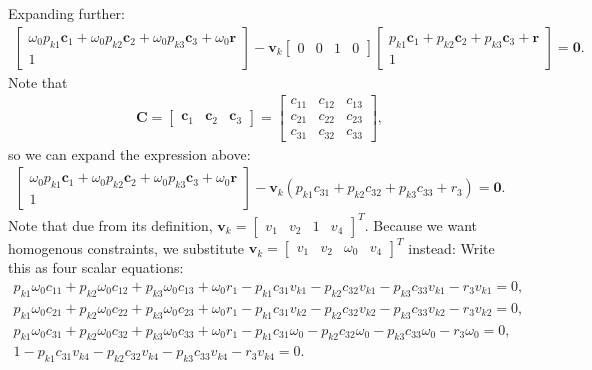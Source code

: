\documentclass{article}
\newcommand{\mbf}[1]{\mathbf{#1}}
\begin{document}
Expanding further:
\begin{align}
    \begin{bmatrix}\omega_0 p_{k1} \mbf{c}_1 + \omega_0 p_{k2} \mbf{c}_2 + \omega_0 p_{k3} \mbf{c}_3 + \omega_0 \mbf{r} \\ 1\end{bmatrix} - \mbf{v}_k \begin{bmatrix} 0 & 0 & 1 & 0 \end{bmatrix} \begin{bmatrix} p_{k1} \mbf{c}_1 + p_{k2} \mbf{c}_2 + p_{k3} \mbf{c}_3 + \mbf{r} \\ 1\end{bmatrix} = \mbf{0}.
\end{align}
Note that
\begin{align}
    \mbf{C} = \begin{bmatrix} \mbf{c}_1 & \mbf{c}_2 & \mbf{c}_3\end{bmatrix} = \begin{bmatrix} c_{11} & c_{12} & c_{13} \\ c_{21} & c_{22} & c_{23} \\ c_{31} & c_{32} & c_{33} \end{bmatrix},
\end{align}
so we can expand the expression above:
\begin{align}
    \begin{bmatrix}\omega_0 p_{k1} \mbf{c}_1 + \omega_0 p_{k2} \mbf{c}_2 + \omega_0 p_{k3} \mbf{c}_3 + \omega_0 \mbf{r} \\ 1\end{bmatrix} - \mbf{v}_k (p_{k1}c_{31} + p_{k2} c_{32} + p_{k3} c_{33} + r_3) = \mbf{0}.
\end{align}
Note that due from its definition, $\mbf{v}_k = \begin{bmatrix} v_1 & v_2 & 1 & v_4 \end{bmatrix}^T$. Because we want homogenous
constraints, we substitute $\mbf{v}_k = \begin{bmatrix} v_1 & v_2 & \omega_0 & v_4 \end{bmatrix}^T$ instead:
Write this as four scalar equations:
\begin{align}
    p_{k1} \omega_0 c_{11} + p_{k2} \omega_0 c_{12} + p_{k3} \omega_0 c_{13} + \omega_0 r_1 - p_{k1} c_{31} v_{k1}- p_{k2} c_{32} v_{k1} - p_{k3} c_{33} v_{k1} - r_3 v_{k1}= 0,\\
    p_{k1} \omega_0 c_{21} + p_{k2} \omega_0 c_{22} + p_{k3} \omega_0 c_{23} + \omega_0 r_1 - p_{k1} c_{31} v_{k2}- p_{k2} c_{32} v_{k2} - p_{k3} c_{33} v_{k2} - r_3 v_{k2}= 0,\\
    p_{k1} \omega_0 c_{31} + p_{k2} \omega_0 c_{32} + p_{k3} \omega_0 c_{33} + \omega_0 r_1 - p_{k1} c_{31} \omega_0- p_{k2} c_{32} \omega_0 - p_{k3} c_{33} \omega_0 - r_3 \omega_0 = 0,\\
    1 - p_{k1} c_{31} v_{k4}- p_{k2} c_{32} v_{k4} - p_{k3} c_{33} v_{k4} - r_3 v_{k4}= 0.
\end{align}
\end{document}
